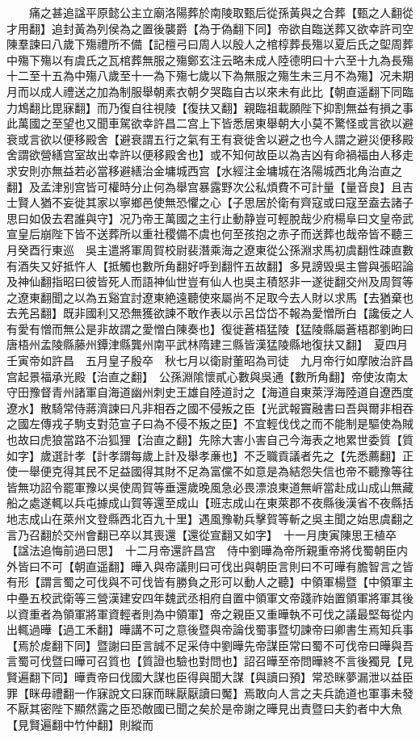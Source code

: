 　　痛之甚追諡平原懿公主立廟洛陽葬於南陵取甄后從孫黃與之合葬【甄之人翻從才用翻】追封黃為列侯為之置後襲爵【為于偽翻下同】帝欲自臨送葬又欲幸許司空陳羣諫曰八歲下殤禮所不備【記檀弓曰周人以殷人之棺椁葬長殤以夏后氏之堲周葬中殤下殤以有虞氏之瓦棺葬無服之殤鄭玄注云略未成人陸德明曰十六至十九為長殤十二至十五為中殤八歲至十一為下殤七歲以下為無服之殤生未三月不為殤】况未期月而以成人禮送之加為制服舉朝素衣朝夕哭臨自古以來未有此比【朝直遥翻下同臨力鴆翻比毘寐翻】而乃復自往視陵【復扶又翻】親臨祖載願陛下抑割無益有損之事此萬國之至望也又聞車駕欲幸許昌二宫上下皆悉居東舉朝大小莫不驚怪或言欲以避衰或言欲以便移殿舍【避衰謂五行之氣有王有衰徙舍以避之也今人謂之避災便移殿舍謂欲營繕宫室故出幸許以便移殿舍也】或不知何故臣以為吉凶有命禍福由人移走求安則亦無益若必當移避繕治金墉城西宫【水經注金墉城在洛陽城西北角治直之翻】及孟津别宫皆可權時分止何為舉宫暴露野次公私煩費不可計量【量音良】且吉士賢人猶不妄徙其家以寧鄉邑使無恐懼之心【子思居於衛有齊寇或曰寇至盍去諸子思曰如伋去君誰與守】况乃帝王萬國之主行止動静豈可輕脫哉少府楊阜曰文皇帝武宣皇后崩陛下皆不送葬所以重社稷備不虞也何至孩抱之赤子而送葬也哉帝皆不聽三月癸酉行東巡　吳主遣將軍周賀校尉裴潛乘海之遼東從公孫淵求馬初虞翻性疎直數有酒失又好抵忤人【抵觸也數所角翻好呼到翻忤五故翻】多見謗毁吳主嘗與張昭論及神仙翻指昭曰彼皆死人而語神仙世豈有仙人也吳主積怒非一遂徙翻交州及周賀等之遼東翻聞之以為五谿宜討遼東絶遠聽使來屬尚不足取今去人財以求馬【去猶棄也去羌呂翻】既非國利又恐無獲欲諫不敢作表以示呂岱岱不報為愛憎所白【讒佞之人有愛有憎而無公是非故謂之愛憎白陳奏也】復徙蒼梧猛陵【猛陵縣屬蒼梧郡劉昫曰唐梧州孟陵縣藤州鐔津縣龔州南平武林隋建三縣皆漢猛陵縣地復扶又翻】　夏四月壬寅帝如許昌　五月皇子殷卒　秋七月以衛尉董昭為司徒　九月帝行如摩陂治許昌宫起景福承光殿【治直之翻】　公孫淵隂懷貳心數與吳通【數所角翻】帝使汝南太守田豫督青州諸軍自海道幽州刺史王雄自陸道討之【海道自東萊浮海陸道自遼西度遼水】散騎常侍蔣濟諫曰凡非相吞之國不侵叛之臣【光武報竇融書曰吾與爾非相吞之國左傳戎子駒支對范宣子曰為不侵不叛之臣】不宜輕伐伐之而不能制是驅使為賊也故曰虎狼當路不治狐狸【治直之翻】先除大害小害自己今海表之地累世委質【質如字】歲選計孝【計孝謂每歲上計及舉孝亷也】不乏職貢議者先之【先悉薦翻】正使一舉便克得其民不足益國得其財不足為富儻不如意是為結怨失信也帝不聽豫等往皆無功詔令罷軍豫以吳使周賀等垂還歲晚風急必畏漂浪東道無㟁當赴成山成山無藏船之處遂輒以兵屯據成山賀等還至成山【班志成山在東萊郡不夜縣後漢省不夜縣括地志成山在萊州文登縣西北百九十里】遇風豫勒兵擊賀等斬之吳主聞之始思虞翻之言乃召翻於交州會翻已卒以其喪還【還從宣翻又如字】　十一月庚寅陳思王植卒【諡法追悔前過曰思】　十二月帝還許昌宫　侍中劉曄為帝所親重帝將伐蜀朝臣内外皆曰不可【朝直遥翻】曄入與帝議則曰可伐出與朝臣言則曰不可曄有膽智言之皆有形【謂言蜀之可伐與不可伐皆有勝負之形可以動人之聽】中領軍楊暨【中領軍主中壘五校武衛等三營漢建安四年魏武丞相府自置中領軍文帝踐祚始置領軍將軍其後以資重者為領軍將軍資輕者則為中領軍】帝之親臣又重曄執不可伐之議最堅每從内出輒過曄【過工禾翻】曄講不可之意後暨與帝論伐蜀事暨切諫帝曰卿書生焉知兵事【焉於䖍翻下同】暨謝曰臣言誠不足采侍中劉曄先帝謀臣常曰蜀不可伐帝曰曄與吾言蜀可伐暨曰曄可召質也【質證也驗也對問也】詔召曄至帝問曄終不言後獨見【見賢遍翻下同】曄責帝曰伐國大謀也臣得與聞大謀【與讀曰預】常恐眯夢漏泄以益臣罪【眯毋禮翻一作寐說文曰寐而眯厭厭讀曰魘】焉敢向人言之夫兵詭道也軍事未發不厭其密陛下顯然露之臣恐敵國已聞之矣於是帝謝之曄見出責暨曰夫釣者中大魚【見賢遍翻中竹仲翻】則縱而
